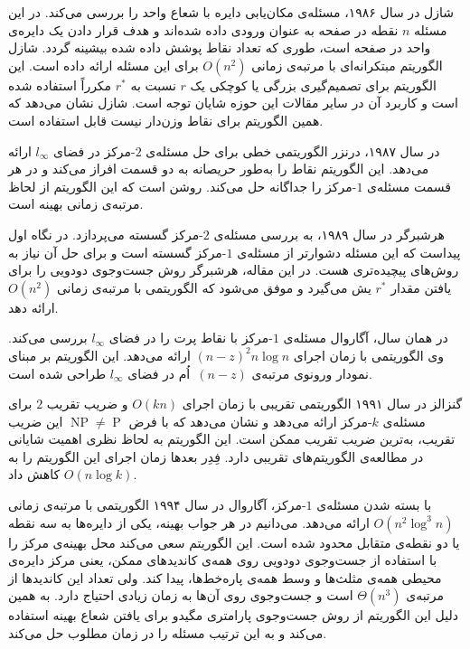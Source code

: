 شازل  در سال ۱۹۸۶، مسئله‌ی مکان‌یابی دایره با شعاع واحد را بررسی می‌کند. در این مسئله $n$ نقطه در صفحه به عنوان ورودی داده شده‌اند و هدف قرار دادن یک دایره‌ی واحد در صفحه است، طوری که تعداد نقاط پوشش داده شده بیشینه گردد. شازل الگوریتم مبتکرانه‌ای با مرتبه‌ی زمانی $O(n^2)$ برای این مسئله ارائه داده است. این الگوریتم برای تصمیم‌گیری بزرگی یا کوچکی یک $r$ نسبت به $r^*$ مکرراً استفاده شده است و کاربرد آن در سایر مقالات این حوزه شایان توجه است. شازل نشان می‌دهد که همین الگوریتم برای نقاط وزن‌دار نیست قابل استفاده است.

در سال ۱۹۸۷، درنزر  الگوریتمی خطی برای حل مسئله‌ی $2$-مرکز در فضای $l_\infty$ ارائه می‌دهد. این الگوریتم نقاط را به‌طور حریصانه به دو قسمت افراز می‌کند و در هر قسمت مسئله‌ی $1$-مرکز را جداگانه حل می‌کند. روشن است که این الگوریتم از لحاظ مرتبه‌ی زمانی بهینه است.

هرشبرگر  در سال ۱۹۸۹، به بررسی مسئله‌ی $2$-مرکز گسسته می‌پردازد. در نگاه اول پیداست که این مسئله دشوارتر از مسئله‌ی $1$-مرکز گسسته است و برای حل آن نیاز به روش‌های پیچیده‌تری هست. در این مقاله، هرشبرگر روش جست‌وجوی دودویی را برای یافتن مقدار $r^*$ یش می‌گیرد و موفق می‌شود که الگوریتمی با مرتبه‌ی زمانی $O(n^2)$ ارائه دهد.

در همان سال، آگاروال  مسئله‌ی $1$-مرکز با نقاط پرت را در فضای $l_\infty$ بررسی می‌کند. وی الگوریتمی با زمان اجرای
$(n-z)^2 n \log n$
ارائه می‌دهد. این الگوریتم بر مبنای نمودار ورونوی مرتبه‌ی $(n-z)$~اُم در فضای $l_\infty$ طراحی شده است.

گنزالز  در سال ۱۹۹۱ الگوریتمی تقریبی با زمان اجرای $O(kn)$ و ضریب تقریب $2$ برای مسئله‌ی $k$-مرکز ارائه می‌دهد و نشان می‌دهد که با فرض
$\mathrm{\mathop{NP}} \neq \mathrm{\mathop{P}}$
این ضریب تقریب، به‌ترین ضریب تقریب ممکن است. این الگوریتم به لحاظ نظری اهمیت شایانی در مطالعه‌ی الگوریتم‌های تقریبی دارد. فِدِر  بعدها زمان اجرای این الگوریتم را به $O(n \log k)$ کاهش داد.

با بسته شدن مسئله‌ی $1$-مرکز، آگاروال  در سال ۱۹۹۴ الگوریتمی با مرتبه‌ی زمانی $O(n^2 \log^3 n)$ ارائه می‌دهد. می‌دانیم در هر جواب بهینه، یکی از دایره‌ها به سه نقطه یا دو نقطه‌ی متقابل محدود شده است. این الگوریتم سعی می‌کند محل بهینه‌ی مرکز را با استفاده از جست‌وجوی دودویی روی همه‌ی کاندیدهای ممکن، یعنی مرکز دایره‌ی محیطی همه‌ی مثلث‌ها و وسط همه‌ی پاره‌خط‌ها، پیدا کند. ولی تعداد این کاندیدها از مرتبه‌ی $\Theta(n^3)$ است و جست‌وجوی روی آن‌ها به زمان زیادی احتیاج دارد. به همین دلیل این الگوریتم از روش جست‌وجوی پارامتری  مگیدو  برای یافتن شعاع بهینه استفاده می‌کند و به این ترتیب مسئله را در زمان مطلوب حل می‌کند.

